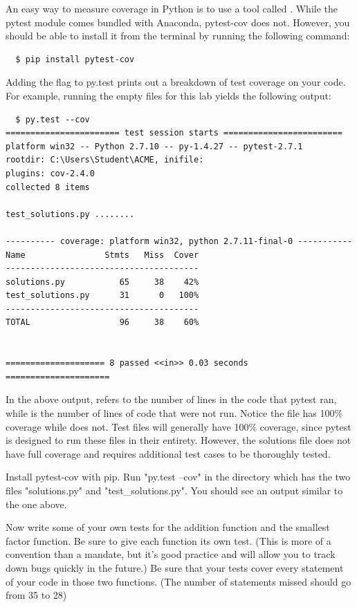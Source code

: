 An easy way to measure coverage in Python is to use a tool called  . While the pytest module comes bundled with Anaconda, pytest-cov does not.  However, you should be able to install it from the terminal by running the following command:
\begin{lstlisting}
  $ pip install pytest-cov
\end{lstlisting}
Adding the flag  to py.test prints out a breakdown of test coverage on your code. For example, running the empty files for this lab yields the following output:
\begin{lstlisting}
  $ py.test --cov
======================= test session starts ========================
platform win32 -- Python 2.7.10 -- py-1.4.27 -- pytest-2.7.1
rootdir: C:\Users\Student\ACME, inifile:
plugins: cov-2.4.0
collected 8 items

test_solutions.py ........

---------- coverage: platform win32, python 2.7.11-final-0 -----------
Name                Stmts   Miss  Cover
---------------------------------------
solutions.py           65     38    42%
test_solutions.py      31      0   100%
---------------------------------------
TOTAL                  96     38    60%


==================== 8 passed <<in>> 0.03 seconds =====================
\end{lstlisting}

In the above output,  refers to the number of lines in the code that pytest ran, while  is the number of lines of code that were not run.
Notice the file  has 100\% coverage while  does not. Test files will generally have 100\% coverage, since pytest is designed to run these files in their entirety. However, the solutions file does not have full coverage and requires additional test cases to be thoroughly tested.

\begin{problem}
Install pytest-cov with pip.
Run "py.test --cov" in the directory which has the two files "solutions.py" and "test\_solutions.py". You should see an output similar to the one above.

Now write some of your own tests for the addition function and the smallest factor function. Be sure to give each function its own test. (This is more of a convention than a mandate,
but it's good practice and will allow you to track down bugs quickly in the future.) Be sure that your tests cover every statement of your code in those two functions.
(The number of statements missed should go from 35 to 28)
\end{problem}

